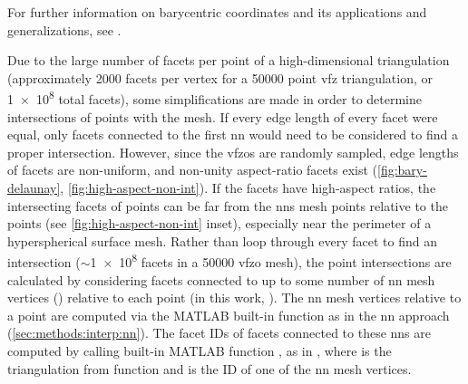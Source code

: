 \documentclass[final,twocolumn,12pt]{elsarticle}
\begin{document}
\begin{appendices}
For further information on barycentric coordinates and its applications and generalizations, see \cite{anisimovSubdividingBarycentricCoordinates2016,budninskiyPowerCoordinatesGeometric2016,dyerBarycentricCoordinateNeighbourhoods2016,floaterGeneralizedBarycentricCoordinates2015,floaterInjectivityWachspressMean2010,hormannDiscretizingWachspressKernels2017,hormannMaximumEntropyCoordinates2008,langerHigherOrderBarycentric2008,langerSphericalBarycentricCoordinates2006,leiNewCoordinateSystem2020,meyerGeneralizedBarycentricCoordinates2002,peixotoVectorFieldReconstructions2014,pihajokiBarycentricInterpolationRiemannian2019,rustamovBarycentricCoordinatesSurfaces2010,skalaRobustBarycentricCoordinates2013,taoFastNumericalSolver2019,warrenBarycentricCoordinatesConvex2007}.

Due to the large number of facets per point of a high-dimensional triangulation (approximately \num{2000} facets per vertex for a \num{50000} point \gls{vfz} triangulation, or \num{1e8} total facets), some simplifications are made in order to determine intersections of \outpt{} points with the mesh. If every edge length of every facet were equal, only facets connected to the first \gls{nn} would need to be considered to find a proper intersection. However, since the \glspl{vfzo} are randomly sampled, edge lengths of facets are non-uniform, and non-unity aspect-ratio facets exist (\cref{fig:bary-delaunay}, \cref{fig:high-aspect-non-int}). If the facets have high-aspect ratios, the intersecting facets of \outpt{} points can be far from the \glspl{nn} mesh points relative to the \outpt{} points (see \cref{fig:high-aspect-non-int} inset), especially near the perimeter of a hyperspherical surface mesh. Rather than loop through every facet to find an intersection ($\sim$\num{1e8} facets in a \num{50000} \gls{vfzo} mesh), the \outpt{} point intersections are calculated by considering facets connected to up to some number of \gls{nn} mesh vertices () relative to each \outpt{} point (in this work, ). The \gls{nn} mesh vertices relative to a \outpt{} point are computed via the MATLAB built-in function  as in the \gls{nn} approach (\cref{sec:methods:interp:nn}). The facet IDs of facets connected to these \glspl{nn} are computed by calling built-in MATLAB function , as in , where  is the triangulation from \vfzorepo{} function  and  is the ID of one of the \gls{nn} mesh vertices. 


\end{appendices}
\end{document}

